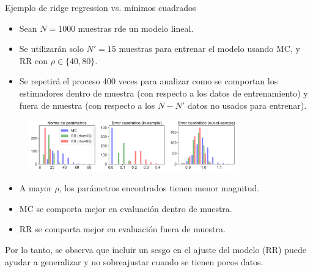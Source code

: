 \documentclass[handout, 9pt]{beamer}
\begin{document}
\begin{frame}{Ejemplo de ridge regression vs. mínimos cuadrados}

\begin{itemize}
	\item Sean $N=1000$ muestras rde un modelo lineal.\pause
	\item Se utilizarán solo $N'=15$ muestras para entrenar el modelo usando MC, y RR con $\rho\in\{40,80\}$.\pause
	\item Se repetirá el proceso 400 veces para analizar como se comportan los estimadores dentro de muestra (con respecto a los datos de entrenamiento) y fuera de muestra (con respecto a los $N-N'$ datos no usados para entrenar).\pause
\end{itemize}
	
\begin{figure}[H]
	\centering
	\includegraphics[width=0.8\textwidth]{../img/cap2_bias-variance.pdf}\\
	\label{fig:MCvsRR_Synth}  
\end{figure}\pause

\begin{itemize}
	\item A mayor $\rho$, los parámetros encontrados tienen menor magnitud.\pause
	\item MC se comporta mejor en evaluación dentro de muestra.\pause
	\item RR se comporta mejor en evaluación fuera de muestra.\pause
\end{itemize}

Por lo tanto, se observa que incluir un sesgo en el ajuste del modelo (RR) puede ayudar a generalizar y no sobreajustar cuando se tienen pocos datos. 
		
\end{frame}
\end{document}

